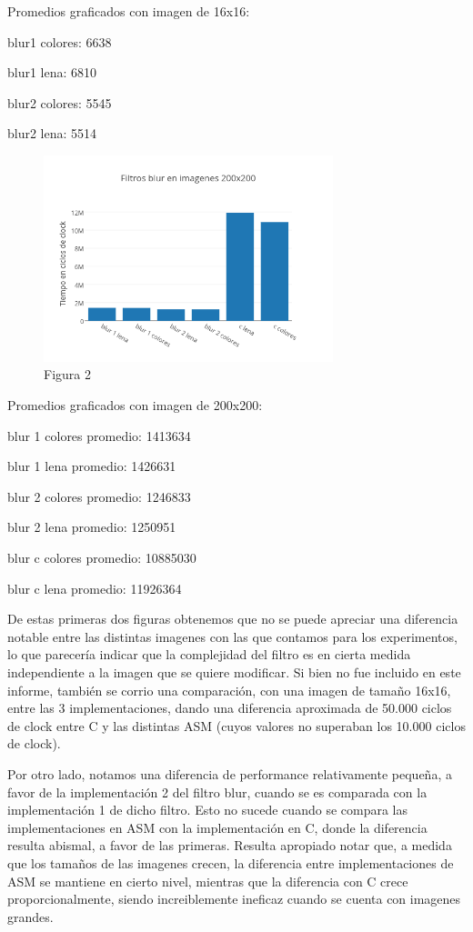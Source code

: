 \documentclass[a4paper]{article}
\begin{document}
Promedios graficados con imagen de 16x16:

blur1 colores: 6638

blur1 lena: 6810

blur2 colores: 5545

blur2 lena: 5514


\begin{figure}[h]
  \centering
    \includegraphics[width=0.75\textwidth]{imagenes/FiltrosBlurEnImagenes200x200.png}
  \caption{Figura 2}
  \label{fig:graficoblur2}
\end{figure}
 \FloatBarrier


Promedios graficados con imagen de 200x200:

blur 1 colores promedio: 1413634

blur 1 lena promedio: 1426631

blur 2 colores promedio: 1246833

blur 2 lena promedio: 1250951

blur c colores promedio: 10885030

blur c lena promedio: 11926364

De estas primeras dos figuras obtenemos que no se puede apreciar una diferencia notable entre las distintas imagenes con las que contamos para los experimentos, lo que parecería indicar que la complejidad del filtro es en cierta medida independiente a la imagen que se quiere modificar. Si bien no fue incluido en este informe, también se corrio una comparación, con una imagen de tamaño 16x16, entre las 3 implementaciones, dando una diferencia aproximada de 50.000 ciclos de clock entre C y las distintas ASM (cuyos valores no superaban los 10.000 ciclos de clock).

Por otro lado, notamos una diferencia de performance relativamente pequeña, a favor de la implementación 2 del filtro blur, cuando se es comparada con la implementación 1 de dicho filtro. Esto no sucede cuando se compara las implementaciones en ASM con la implementación en C, donde la diferencia resulta abismal, a favor de las primeras. Resulta apropiado notar que, a medida que los tamaños de las imagenes crecen, la diferencia entre implementaciones de ASM se mantiene en cierto nivel, mientras que la diferencia con C crece proporcionalmente, siendo increiblemente ineficaz cuando se cuenta con imagenes grandes.
\end{document}

